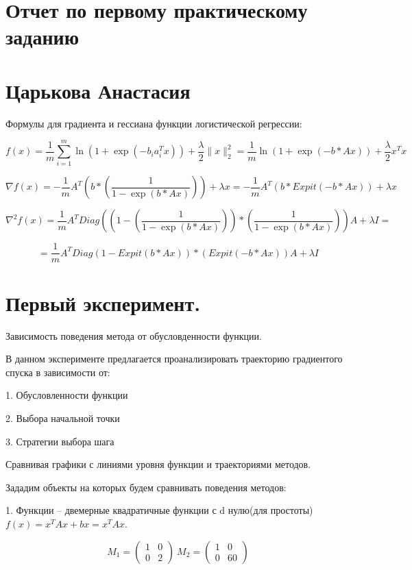 \documentclass{article}
\theoremstyle{definition}
\theoremstyle{remark}
\newcommand{\lfrac} [2] {\displaystyle \frac{#1}{#2}}
\begin{document}
\section*{Отчет по первому практическому заданию}
\section*{Царькова Анастасия}

Формулы для градиента и гессиана функции логистической регрессии:

$$
f(x) = \lfrac{1}{m} \sum_{i = 1}^m \ln(1 + \exp(-b_ia_i^Tx)) + \lfrac{\lambda}{2} \|x\|_2^2 = \lfrac{1}{m} \ln(1 + \exp(-b * Ax)) + \lfrac{\lambda}{2} x^Tx
$$

$$
\nabla f(x) = -\lfrac{1}{m} A^T \left(b * \left(\lfrac{1}{1 - \exp(b * Ax)} \right)\right) + \lambda x = -\lfrac{1}{m} A^T \left(b * Expit(-b * Ax)\right) + \lambda x
$$

$$
\nabla^2 f(x) = \lfrac{1}{m} A^T Diag\left(\left(1 - \left(\lfrac{1}{1 - \exp(b * Ax)} \right)\right) * \left(\lfrac{1}{1 - \exp(b * Ax)} \right)\right)A + \lambda I =
$$

$$
= \lfrac{1}{m} A^T Diag\left(1 - Expit(b * Ax)\right) * \left(Expit(-b * Ax)\right)A + \lambda I
$$

\section{Первый эксперимент.}

Зависимость поведения метода от обусловденности функции.

В данном эксперименте предлагается проанализировать траекторию градиентого спуска в зависимости от:

1. Обусловленности функции

2. Выбора начальной точки

3. Стратегии выбора шага



Сравнивая графики с линиями уровня функции и траекториями методов.



Зададим объекты на которых будем сравнивать поведения методов:

1. Функции --  двемерные квадратичные функции с d нулю(для простоты) $f(x) = x^TAx + bx = x^TAx$.

$$
M_1 =
\begin{pmatrix}
1 &	0\\
0 &	2
\end{pmatrix}\ M_2 =
\begin{pmatrix}
1 &	0\\
0 &	60
\end{pmatrix}
$$
\end{document}

